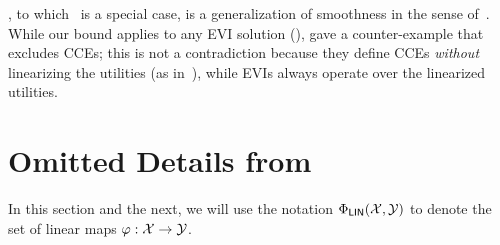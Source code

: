 \begin{remark}
    , to which~ is a special case, is a generalization of smoothness in the sense of~\citet{Roughgarden15:Local}. While our bound applies to any EVI solution (), \citet{Roughgarden15:Local} gave a counter-example that excludes CCEs; this is not a contradiction because they define CCEs \emph{without} linearizing the utilities (as in~), while EVIs always operate over the linearized utilities. 
\end{remark}

\section{Omitted Details from }\label{sec:appendix-joint}
In this section and the next, we will use the notation $\Phi_\mathsf{LIN}({\mathcal{X}}, {\mathcal{Y}})$ to denote the set of linear maps $\varphi : {\mathcal{X}} \to {\mathcal{Y}}$. %

